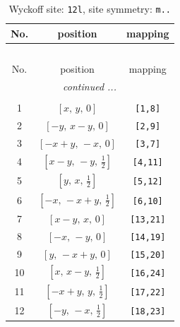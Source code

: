 \documentclass[fleqn,8pt]{jsarticle}
\begin{document}
\begin{longtable}{ccc}
\caption{Wyckoff site: {\tt 12l}, site symmetry: {\tt m..}}
 \\
 \hline \hline
No. & position & mapping \\ \hline \endfirsthead

\multicolumn{2}{l}{\tablename\ \thetable{}} \\
 \hline \hline
No. & position & mapping \\ \hline \endhead

 \hline \hline
\multicolumn{2}{r}{\footnotesize\it continued ...} \\ \endfoot

 \hline \hline
\multicolumn{2}{r}{} \\ \endlastfoot

1 & $\left[ x,\, y,\, 0 \right]$ & {\tt [1,8]} \\ \hline
2 & $\left[ - y,\, x - y,\, 0 \right]$ & {\tt [2,9]} \\ \hline
3 & $\left[ - x + y,\, - x,\, 0 \right]$ & {\tt [3,7]} \\ \hline
4 & $\left[ x - y,\, - y,\, \frac{1}{2} \right]$ & {\tt [4,11]} \\ \hline
5 & $\left[ y,\, x,\, \frac{1}{2} \right]$ & {\tt [5,12]} \\ \hline
6 & $\left[ - x,\, - x + y,\, \frac{1}{2} \right]$ & {\tt [6,10]} \\ \hline
7 & $\left[ x - y,\, x,\, 0 \right]$ & {\tt [13,21]} \\ \hline
8 & $\left[ - x,\, - y,\, 0 \right]$ & {\tt [14,19]} \\ \hline
9 & $\left[ y,\, - x + y,\, 0 \right]$ & {\tt [15,20]} \\ \hline
10 & $\left[ x,\, x - y,\, \frac{1}{2} \right]$ & {\tt [16,24]} \\ \hline
11 & $\left[ - x + y,\, y,\, \frac{1}{2} \right]$ & {\tt [17,22]} \\ \hline
12 & $\left[ - y,\, - x,\, \frac{1}{2} \right]$ & {\tt [18,23]} \\
\end{longtable}
\renewcommand{\arraystretch}{1.2}
\end{document}
